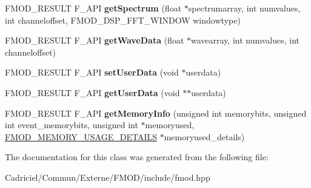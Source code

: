 \begin{DoxyCompactItemize}
\item 
\hypertarget{class_f_m_o_d_1_1_channel_group_a8ee0bad7f2c729641b5d61f2f2aff135}{F\-M\-O\-D\-\_\-\-R\-E\-S\-U\-L\-T F\-\_\-\-A\-P\-I {\bfseries get\-Spectrum} (float $\ast$spectrumarray, int numvalues, int channeloffset, F\-M\-O\-D\-\_\-\-D\-S\-P\-\_\-\-F\-F\-T\-\_\-\-W\-I\-N\-D\-O\-W windowtype)}\label{class_f_m_o_d_1_1_channel_group_a8ee0bad7f2c729641b5d61f2f2aff135}

\item 
\hypertarget{class_f_m_o_d_1_1_channel_group_a8d632fabc33cc9f67e528c76489c9172}{F\-M\-O\-D\-\_\-\-R\-E\-S\-U\-L\-T F\-\_\-\-A\-P\-I {\bfseries get\-Wave\-Data} (float $\ast$wavearray, int numvalues, int channeloffset)}\label{class_f_m_o_d_1_1_channel_group_a8d632fabc33cc9f67e528c76489c9172}

\item 
\hypertarget{class_f_m_o_d_1_1_channel_group_a0a71472fd896173cae99c4d2c42743df}{F\-M\-O\-D\-\_\-\-R\-E\-S\-U\-L\-T F\-\_\-\-A\-P\-I {\bfseries set\-User\-Data} (void $\ast$userdata)}\label{class_f_m_o_d_1_1_channel_group_a0a71472fd896173cae99c4d2c42743df}

\item 
\hypertarget{class_f_m_o_d_1_1_channel_group_a347e86f79b6679e20b4515846644e8a4}{F\-M\-O\-D\-\_\-\-R\-E\-S\-U\-L\-T F\-\_\-\-A\-P\-I {\bfseries get\-User\-Data} (void $\ast$$\ast$userdata)}\label{class_f_m_o_d_1_1_channel_group_a347e86f79b6679e20b4515846644e8a4}

\item 
\hypertarget{class_f_m_o_d_1_1_channel_group_a8483ad1631034c7be3fdcf0a9633bbb7}{F\-M\-O\-D\-\_\-\-R\-E\-S\-U\-L\-T F\-\_\-\-A\-P\-I {\bfseries get\-Memory\-Info} (unsigned int memorybits, unsigned int event\-\_\-memorybits, unsigned int $\ast$memoryused, \hyperlink{struct_f_m_o_d___m_e_m_o_r_y___u_s_a_g_e___d_e_t_a_i_l_s}{F\-M\-O\-D\-\_\-\-M\-E\-M\-O\-R\-Y\-\_\-\-U\-S\-A\-G\-E\-\_\-\-D\-E\-T\-A\-I\-L\-S} $\ast$memoryused\-\_\-details)}\label{class_f_m_o_d_1_1_channel_group_a8483ad1631034c7be3fdcf0a9633bbb7}

\end{DoxyCompactItemize}


The documentation for this class was generated from the following file\-:\begin{DoxyCompactItemize}
\item 
Cadriciel/\-Commun/\-Externe/\-F\-M\-O\-D/include/fmod.\-hpp\end{DoxyCompactItemize}
